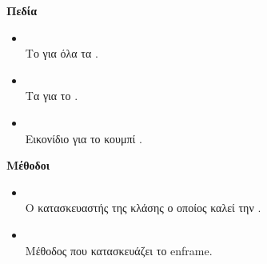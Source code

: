 \noindent\textbf{Πεδία}

\begin{itemize}
\item{} \\
Το  για όλα τα .
\item{} \\
Τα  για το .
\item{} \\
Εικονίδιο για το κουμπί .
\end{itemize}

\noindent\textbf{Μέθοδοι}

\begin{itemize}
\item{}\\
Ο κατασκευαστής της κλάσης ο οποίος καλεί την .
\item{}\\
Μέθοδος που κατασκευάζει το en{frame}.
\end{itemize}